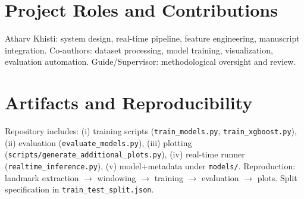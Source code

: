 \documentclass[conference]{IEEEtran}
\begin{document}
\section{Project Roles and Contributions}
Atharv Khisti: system design, real-time pipeline, feature engineering, manuscript integration. Co-authors: dataset processing, model training, visualization, evaluation automation. Guide/Supervisor: methodological oversight and review.

\section{Artifacts and Reproducibility}
Repository includes: (i) training scripts (\texttt{train\_models.py}, \texttt{train\_xgboost.py}), (ii) evaluation (\texttt{evaluate\_models.py}), (iii) plotting (\texttt{scripts/generate\_additional\_plots.py}), (iv) real-time runner (\texttt{realtime\_inference.py}), (v) model+metadata under \texttt{models/}. Reproduction: landmark extraction \(\rightarrow\) windowing \(\rightarrow\) training \(\rightarrow\) evaluation \(\rightarrow\) plots. Split specification in \texttt{train\_test\_split.json}.
\end{document}
